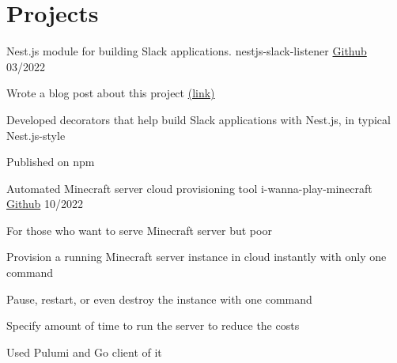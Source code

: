\section{Projects}

\cventry
{Nest.js module for building Slack applications.}
{nestjs-slack-listener}
{\href{https://github.com/hanchchch/nestjs-slack-listener}{Github}}
{03/2022}
\begin{cvitems}
\item {Wrote a blog post about this project \href{https://velog.io/@hanchchch/%EC%A7%84%EC%8B%AC%EC%9C%BC%EB%A1%9C-%EC%97%85%EB%AC%B4-%EC%9E%90%EB%8F%99%ED%99%94-%EC%8A%AC%EB%9E%99%EB%B4%87-%EB%A7%8C%EB%93%A4%EA%B8%B0-1}{(link)}}
\item {Developed decorators that help build Slack applications with Nest.js, in typical Nest.js-style}
\item {Published on npm}
\end{cvitems}

\cventry
{Automated Minecraft server cloud provisioning tool}
{i-wanna-play-minecraft}
{\href{https://github.com/hanchchch/i-wanna-play-minecraft}{Github}}
{10/2022}
\begin{cvitems}
\item {For those who want to serve Minecraft server but poor}
\item {Provision a running Minecraft server instance in cloud instantly with only one command}
\item {Pause, restart, or even destroy the instance with one command}
\item {Specify amount of time to run the server to reduce the costs}
\item {Used Pulumi and Go client of it}
\end{cvitems}
